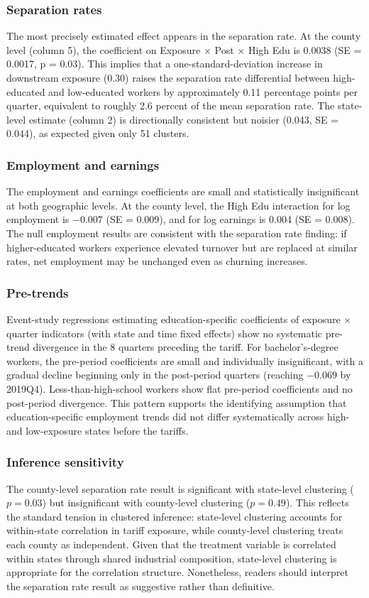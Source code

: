 \documentclass[12pt]{article}
\begin{document}
\subsubsection*{Separation rates} The most precisely estimated effect appears in the separation rate. At the county level (column 5), the coefficient on Exposure $\times$ Post $\times$ High Edu is 0.0038 (SE = 0.0017, p = 0.03). This implies that a one-standard-deviation increase in downstream exposure (0.30) raises the separation rate differential between high-educated and low-educated workers by approximately 0.11 percentage points per quarter, equivalent to roughly 2.6 percent of the mean separation rate. The state-level estimate (column 2) is directionally consistent but noisier (0.043, SE = 0.044), as expected given only 51 clusters.

\subsubsection*{Employment and earnings} The employment and earnings coefficients are small and statistically insignificant at both geographic levels. At the county level, the High Edu interaction for log employment is $-0.007$ (SE = 0.009), and for log earnings is 0.004 (SE = 0.008). The null employment results are consistent with the separation rate finding: if higher-educated workers experience elevated turnover but are replaced at similar rates, net employment may be unchanged even as churning increases.

\subsubsection*{Pre-trends} Event-study regressions estimating education-specific coefficients of exposure $\times$ quarter indicators (with state and time fixed effects) show no systematic pre-trend divergence in the 8 quarters preceding the tariff. For bachelor's-degree workers, the pre-period coefficients are small and individually insignificant, with a gradual decline beginning only in the post-period quarters (reaching $-0.069$ by 2019Q4). Less-than-high-school workers show flat pre-period coefficients and no post-period divergence. This pattern supports the identifying assumption that education-specific employment trends did not differ systematically across high- and low-exposure states before the tariffs.

\subsubsection*{Inference sensitivity} The county-level separation rate result is significant with state-level clustering ($p = 0.03$) but insignificant with county-level clustering ($p = 0.49$). This reflects the standard tension in clustered inference: state-level clustering accounts for within-state correlation in tariff exposure, while county-level clustering treats each county as independent. Given that the treatment variable is correlated within states through shared industrial composition, state-level clustering is appropriate for the correlation structure. Nonetheless, readers should interpret the separation rate result as suggestive rather than definitive.
\end{document}
